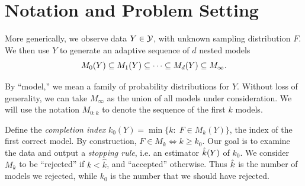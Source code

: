 \documentclass{article}
\begin{document}

\section{Notation and Problem Setting}
\label{sec:genericSetting}

More generically, we observe data $Y \in \mathcal{Y}$, with unknown sampling distribution $F$. We then use $Y$ to generate an adaptive sequence of $d$ nested models
\[
M_0(Y) \subseteq M_1(Y) \subseteq \cdots \subseteq M_d(Y) \subseteq M_\infty.
\]

By ``model,'' we mean a family of probability distributions for $Y$. Without loss of generality, we can take $M_\infty$ as the union of all models under consideration. We will use the notation $M_{0:k}$ to denote the sequence of the first $k$ models.

Define the {\em completion index} $k_0(Y) = \min\{k:\; F \in M_k(Y)\}$, the index of the first correct model. By construction, $F\in M_k \iff k \geq k_0$. Our goal is to examine the data and output a {\em stopping rule}, i.e. an estimator $\hat{k}(Y)$ of $k_0$. We consider $M_k$ to be ``rejected'' if $k < \hat k$, and ``accepted'' otherwise. Thus $\hat{k}$ is the number of models we rejected, while $k_0$ is the number that we should have rejected. 
\end{document}
